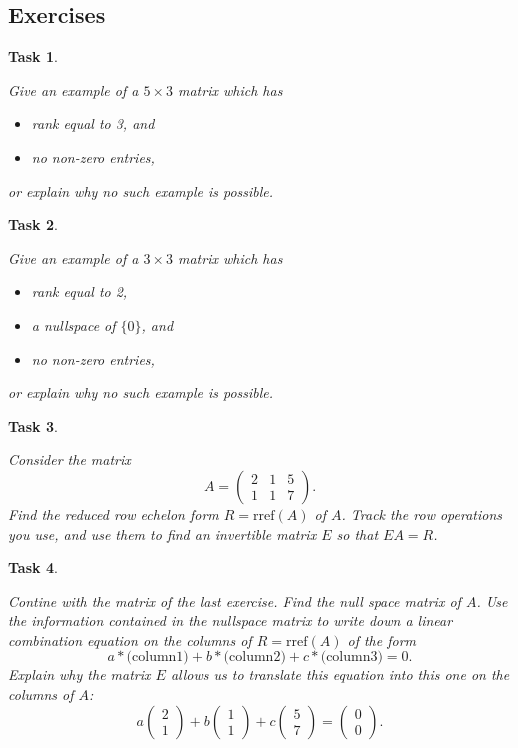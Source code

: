 \documentclass[10pt,]{book}
\theoremstyle{plain}
\numberwithin{equation}{section}
\newtheorem{task}{Task}[chapter]
\begin{document}
\subsection[Exercises]{Exercises}\label{subsection-72}
\begin{task}
\label{task-94}

        Give an example of a \(5 \times 3\) matrix which has
        \begin{itemize}
\item{}rank equal to 3, and\item{}no non-zero entries,\end{itemize}

        or explain why no such example is possible.
      \end{task}
\begin{task}
\label{task-95}

        Give an example of a \(3 \times 3\) matrix which has
        \begin{itemize}
\item{}rank equal to 2,\item{}a nullspace of \(\{0\}\), and\item{}no non-zero entries,\end{itemize}

        or explain why no such example is possible.
      \end{task}
\begin{task}
\label{task-96}

        Consider the matrix \[
        A = \left( \begin{smallmatrix} 2 & 1 & 5 \\ 1 & 1
        & 7 \end{smallmatrix}\right).\]
        Find the reduced row echelon form \(R = \mathrm{rref}(A)\)
        of \(A\). Track the row operations you use, and use them to
        find an invertible matrix \(E\) so that \(EA = R\).
      \end{task}
\begin{task}
\label{task-97}

        Contine with the matrix of the last exercise. Find the null space matrix of
        \(A\). Use the information contained in the nullspace matrix to
        write down a linear combination equation on the columns of
        \(R = \mathrm{rref}(A)\) of the form
        \[
          a * \text{(column1)} + b * \text{(column2)} + c * \text{(column3)} = 0.
        \]
        Explain why the matrix \(E\) allows us to translate this equation
        into this one on the columns of \(A\):
        \[
          a\begin{pmatrix} 2 \\ 1 \end{pmatrix} +
          b \begin{pmatrix} 1 \\ 1 \end{pmatrix} +
          c \begin{pmatrix} 5 \\ 7 \end{pmatrix} =
          \begin{pmatrix}0\\ 0 \end{pmatrix}.
        \]\end{task}
\end{document}

